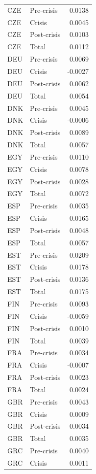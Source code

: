 \begin{longtable}[t]{llr}
CZE & Pre-crisis & 0.0138\\
CZE & Crisis & 0.0045\\
CZE & Post-crisis & 0.0103\\
\addlinespace
CZE & Total & 0.0112\\
DEU & Pre-crisis & 0.0069\\
DEU & Crisis & -0.0027\\
DEU & Post-crisis & 0.0062\\
DEU & Total & 0.0054\\
\addlinespace
DNK & Pre-crisis & 0.0045\\
DNK & Crisis & -0.0006\\
DNK & Post-crisis & 0.0089\\
DNK & Total & 0.0057\\
EGY & Pre-crisis & 0.0110\\
\addlinespace
EGY & Crisis & 0.0078\\
EGY & Post-crisis & 0.0028\\
EGY & Total & 0.0072\\
ESP & Pre-crisis & 0.0035\\
ESP & Crisis & 0.0165\\
\addlinespace
ESP & Post-crisis & 0.0048\\
ESP & Total & 0.0057\\
EST & Pre-crisis & 0.0209\\
EST & Crisis & 0.0178\\
EST & Post-crisis & 0.0136\\
\addlinespace
EST & Total & 0.0175\\
FIN & Pre-crisis & 0.0093\\
FIN & Crisis & -0.0059\\
FIN & Post-crisis & 0.0010\\
FIN & Total & 0.0039\\
\addlinespace
FRA & Pre-crisis & 0.0034\\
FRA & Crisis & -0.0007\\
FRA & Post-crisis & 0.0023\\
FRA & Total & 0.0024\\
GBR & Pre-crisis & 0.0043\\
\addlinespace
GBR & Crisis & 0.0009\\
GBR & Post-crisis & 0.0034\\
GBR & Total & 0.0035\\
GRC & Pre-crisis & 0.0040\\
GRC & Crisis & 0.0011\\

\end{longtable}

